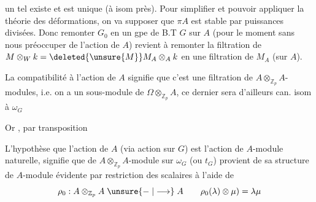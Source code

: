 un tel  existe et est unique (à isom  près).  Pour simplifier et pouvoir appliquer la théorie des déformations, on va supposer que $\pi A$ est stable par puissances divisées. Donc remonter $G_0$ en un gpe de B.T $G$ sur $A$ (pour le moment sans nous préoccuper de l'action de $A$) revient à remonter la filtration de $M\otimes_W k=\deleted{\unsure{M}}M_A\otimes_A k$ en une filtration de $M_A$ (sur $A$).


La compatibilité à l'action de $A$ signifie que c'est une filtration de $A\otimes_{\mathbb Z_p}A$-modules, i.e. on a un sous-module  de $\Omega\otimes_{\mathbb Z_p}A$,  ce dernier sera  d'ailleurs can. isom à $\omega_G$

Or
, par transposition

L'hypothèse que l'action de $A$  (via action sur $G$) est l'action de $A$-module naturelle, signifie que   de $A\otimes_{\mathbb Z_p}A$-module sur $\omega_G$ (ou $t_G$)  provient de sa structure de $A$-module  évidente par restriction des scalaires à l'aide de
\[
\rho_0:A\otimes_{\mathbb Z_p}A\mathrel{\unsure{\relbar|\longrightarrow}} A\qquad \rho_0(\lambda)\otimes\mu)=\lambda\mu
\]
